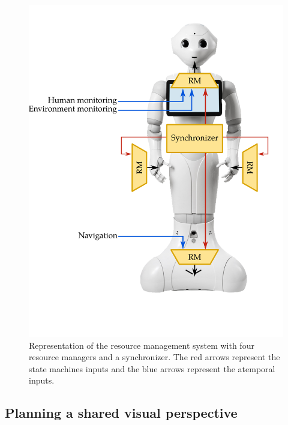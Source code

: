 \begin{figure}[!hb]
\centering
\includegraphics[scale=0.33]{figures/chapter8/rm.png}
\caption{\label{fig:chap8_rm} Representation of the resource management system with four resource managers and a synchronizer. The red arrows represent the state machines inputs and the blue arrows represent the atemporal inputs.}
\end{figure}

\subsection{Planning a shared visual perspective}

